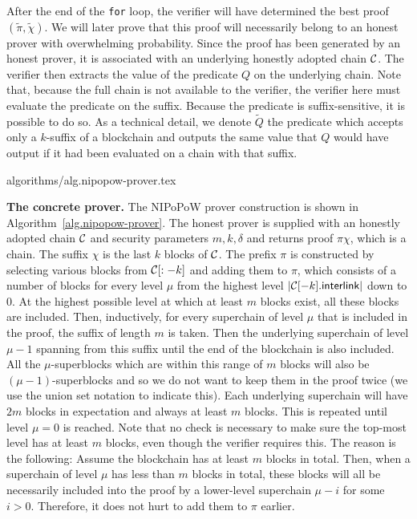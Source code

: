 After the end of the \texttt{for} loop, the verifier will have determined the
best proof $(\tilde\pi, \tilde\chi)$. We will later prove that this proof will
necessarily belong to an honest prover with overwhelming probability. Since the
proof has been generated by an honest prover, it is associated with an
underlying honestly adopted chain $\mathcal{C}$. The verifier then extracts the value
of the predicate $Q$ on the underlying chain. Note that, because the full chain
is not available to the verifier, the verifier here must evaluate the predicate
on the suffix. Because the predicate is suffix-sensitive, it is possible to do
so. As a technical detail, we denote $\tilde Q$ the predicate which accepts only
a $k$-suffix of a blockchain and outputs the same value that $Q$ would have
output if it had been evaluated on a chain with that suffix.

{algorithms/alg.nipopow-prover.tex}

\noindent
\textbf{The concrete prover.}
The NIPoPoW prover construction is shown in Algorithm~\ref{alg.nipopow-prover}.
The honest prover is supplied with an honestly adopted chain $\mathcal{C}$ and
security parameters $m, k, \delta$ and returns proof $\pi\chi$, which is a
chain. The suffix $\chi$ is the last $k$ blocks of $\mathcal{C}$. The prefix $\pi$ is
constructed by selecting various blocks from $\mathcal{C}[:-k]$ and adding them to
$\pi$, which consists of a number of blocks for every level $\mu$ from the
highest level $|\mathcal{C}[-k].\textsf{interlink}|$ down to $0$. At the highest
possible level at which at least $m$ blocks exist, all these blocks are
included. Then, inductively, for every superchain of level $\mu$ that is
included in the proof, the suffix of length $m$ is taken. Then the underlying
superchain of level $\mu - 1$ spanning from this suffix until the end of the
blockchain is also included. All the $\mu$-superblocks which are within this
range of $m$ blocks will also be $(\mu-1)$-superblocks and so we do not want to
keep them in the proof twice (we use the union set notation to indicate this).
Each underlying superchain will have $2m$ blocks in expectation and always at
least $m$ blocks. This is repeated until level $\mu = 0$ is reached. Note that
no check is necessary to make sure the top-most level has at least $m$ blocks,
even though the verifier requires this. The reason is the following: Assume the
blockchain has at least $m$ blocks in total. Then, when a superchain of level
$\mu$ has less than $m$ blocks in total, these blocks will all be necessarily
included into the proof by a lower-level superchain $\mu - i$ for some $i > 0$.
Therefore, it does not hurt to add them to $\pi$ earlier.

